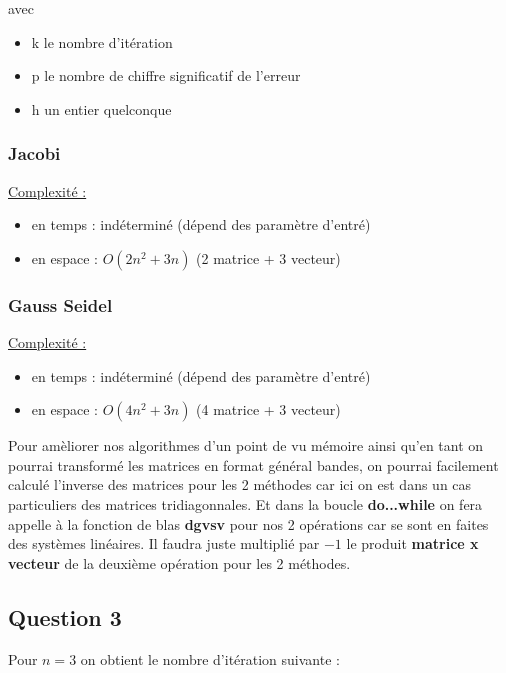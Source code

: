 \documentclass[11pt]{article}
\begin{document}
avec

\begin{itemize}
\item k le nombre d'itération
\item p le nombre de chiffre significatif de l'erreur
\item h un entier quelconque
\end{itemize}

\subsubsection{Jacobi}

\underline{Complexité :}

\begin{itemize}
\item en temps : indéterminé (dépend des paramètre d'entré)
\item en espace : $O(2n^2 + 3n)$ (2 matrice + 3 vecteur)
\end{itemize}

\subsubsection{Gauss Seidel}

\underline{Complexité :}

\begin{itemize}
\item en temps : indéterminé (dépend des paramètre d'entré)
\item en espace : $O(4n^2 + 3n)$ (4 matrice + 3 vecteur)
\end{itemize}

Pour amèliorer nos algorithmes d'un point de vu mémoire ainsi qu'en
tant on pourrai transformé les matrices en format général bandes, on
pourrai facilement calculé l'inverse des matrices pour les 2 méthodes
car ici on est dans un cas particuliers des matrices
tridiagonnales. Et dans la boucle \textbf{do...while} on fera appelle
à la fonction de blas \textbf{dgvsv} pour nos 2 opérations car se sont
en faites des systèmes linéaires. Il faudra juste multiplié par $-1$
le produit \textbf{matrice x vecteur} de la deuxième opération pour
les 2 méthodes.

\subsection{Question 3}

Pour $n = 3$ on obtient le nombre d'itération suivante :
\end{document}
